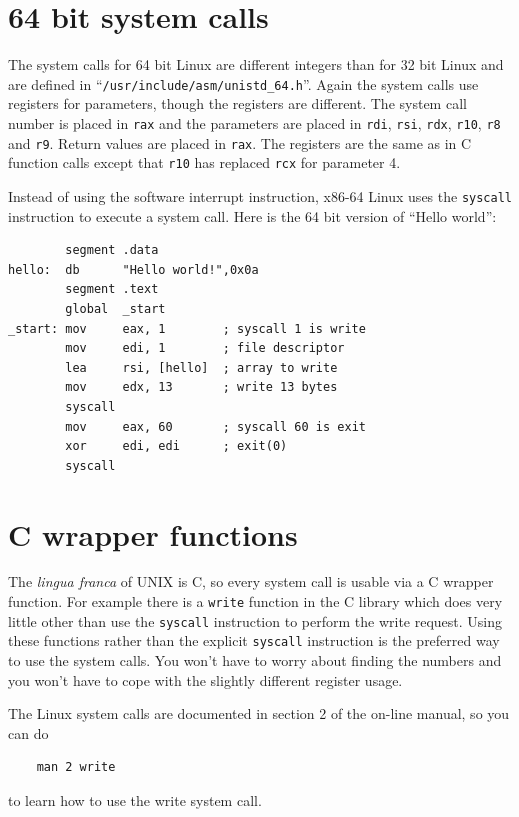 \documentclass[11pt,b5paper]{book}
\begin{document}
\section{64 bit system calls}

The system calls for 64 bit Linux are different integers than for 32 bit Linux and are defined
in ``{\tt /usr/include/asm/unistd\_64.h}''.
Again the system calls use registers for parameters, though the registers are different.
The system call number is placed in {\tt rax} and the parameters
are placed in {\tt rdi}, {\tt rsi}, {\tt rdx}, {\tt r10}, {\tt r8} and {\tt r9}.
Return values are placed in {\tt rax}.
The registers are the same as in C function calls except that {\tt r10} has replaced {\tt rcx}
for parameter 4.

Instead of using the software interrupt instruction, x86-64 Linux uses the {\tt syscall}
instruction to execute a system call.
Here is the 64 bit version of ``Hello world'':

\begin{verbatim}
        segment .data
hello:  db      "Hello world!",0x0a
        segment .text
        global  _start
_start: mov     eax, 1        ; syscall 1 is write
        mov     edi, 1        ; file descriptor
        lea     rsi, [hello]  ; array to write
        mov     edx, 13       ; write 13 bytes
        syscall
        mov     eax, 60       ; syscall 60 is exit
        xor     edi, edi      ; exit(0)
        syscall
\end{verbatim}

\section{C wrapper functions}

The {\it lingua franca} of UNIX is C, so every system call is usable via a C wrapper function.
For example there is a {\tt write} function in the C library which does very little other than
use the {\tt syscall} instruction to perform the write request.
Using these functions rather than the explicit {\tt syscall} instruction is the preferred way to use
the system calls.
You won't have to worry about finding the numbers and you won't have to cope with the slightly different
register usage.

The Linux system calls are documented in section 2 of the on-line manual, so you can do
\begin{verbatim}
    man 2 write
\end{verbatim}
to learn how to use the write system call.
\end{document}
